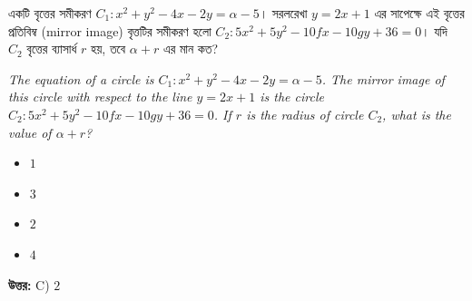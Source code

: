 \documentclass[12pt, a4paper]{article}
\begin{document}
\begin{tcolorbox}[questionbox={প্রশ্ন (Question) 49}]
    \noindent
    একটি বৃত্তের সমীকরণ $C_1: x^2 + y^2 - 4x - 2y = \alpha - 5$। সরলরেখা $y = 2x + 1$ এর সাপেক্ষে এই বৃত্তের প্রতিবিম্ব (mirror image) বৃত্তটির সমীকরণ হলো $C_2: 5x^2 + 5y^2 - 10fx - 10gy + 36 = 0$। যদি $C_2$ বৃত্তের ব্যাসার্ধ $r$ হয়, তবে $\alpha + r$ এর মান কত?
    
    \vspace{0.8em}
    \begin{english}
    \noindent\textit{\color{darkgray}
    The equation of a circle is $C_1: x^2 + y^2 - 4x - 2y = \alpha - 5$. The mirror image of this circle with respect to the line $y = 2x + 1$ is the circle $C_2: 5x^2 + 5y^2 - 10fx - 10gy + 36 = 0$. If $r$ is the radius of circle $C_2$, what is the value of $\alpha + r$?
    }
    \end{english}
\end{tcolorbox}

\begin{itemize}[label={}, leftmargin=1cm, itemsep=0.5em]
    \item[\textbf{A)}] $1$
    \item[\textbf{B)}] $3$
    \item[\textbf{C)}] $2$
    \item[\textbf{D)}] $4$
\end{itemize}

\vspace{0.5em}
\begin{tcolorbox}[answerbox]
    \textbf{\color{success} উত্তর:} C) $2$
\end{tcolorbox}
\vspace{1em}
\end{document}
